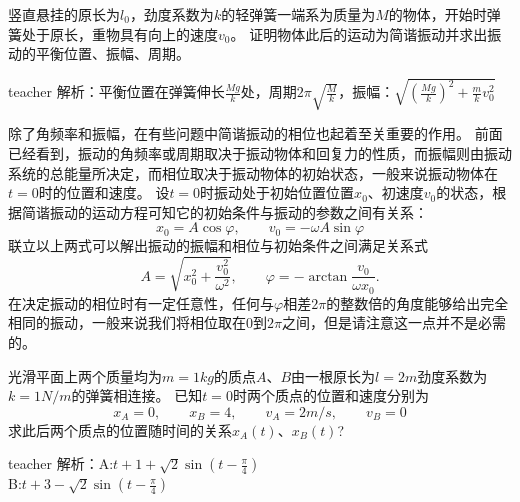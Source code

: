 \begin{example}
竖直悬挂的原长为$l_0$，劲度系数为$k$的轻弹簧一端系为质量为$M$的物体，开始时弹簧处于原长，重物具有向上的速度$v_0$。
证明物体此后的运动为简谐振动并求出振动的平衡位置、振幅、周期。
\begin{taggedblock}{teacher}
\newline
解析：平衡位置在弹簧伸长$\frac{Mg}{k}$处，周期$2\pi\sqrt{\frac{M}{k}}$，振幅：$\sqrt{(\frac{Mg}{k})^2+\frac{m}{k}v_0^2}$
\end{taggedblock}
\end{example}

除了角频率和振幅，在有些问题中简谐振动的相位也起着至关重要的作用。
前面已经看到，振动的角频率或周期取决于振动物体和回复力的性质，而振幅则由振动系统的总能量所决定，而相位取决于振动物体的初始状态，一般来说振动物体在$t=0$时的位置和速度。
设$t=0$时振动处于初始位置位置$x_0$、初速度$v_0$的状态，根据简谐振动的运动方程可知它的初始条件与振动的参数之间有关系：
\[
x_0 = A\cos\varphi,\qquad v_0 = -\omega A\sin\varphi
\]
联立以上两式可以解出振动的振幅和相位与初始条件之间满足关系式
\begin{equation}
A = \sqrt{x_0^2+\frac{v_0^2}{\omega^2}},\qquad \varphi = -\arctan\frac{v_0}{\omega x_0}.
\end{equation}
在决定振动的相位时有一定任意性，任何与$\varphi$相差$2\pi$的整数倍的角度能够给出完全相同的振动，一般来说我们将相位取在0到$2\pi$之间，但是请注意这一点并不是必需的。

%



\begin{example}
光滑平面上两个质量均为$m=1\unit{kg}$的质点$A$、$B$由一根原长为$l=2\unit{m}$劲度系数为$k=1\unit{N/m}$的弹簧相连接。
已知$t=0$时两个质点的位置和速度分别为
\[x_A = 0,\qquad x_B = 4,\qquad v_A = 2\unit{m/s},\qquad v_B=0\]
求此后两个质点的位置随时间的关系$x_A(t)$、$x_B(t)$?
\begin{taggedblock}{teacher}
\newline
解析：A:$t+1+\sqrt{2}\sin(t-\frac{\pi}{4})$
\\B:$t+3-\sqrt{2}\sin(t-\frac{\pi}{4})$
\end{taggedblock}
\end{example}

